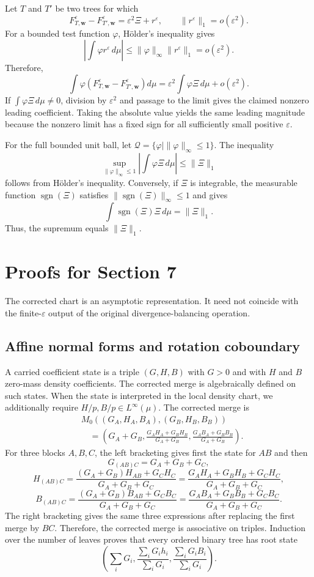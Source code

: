 \documentclass[11pt]{article}
\theoremstyle{plain}
\theoremstyle{definition}
\theoremstyle{definition}
\newcommand{\eps}{\varepsilon}
\newcommand{\QoI}{\mathcal Q}
\newcommand{\wv}{\mathbf w}
\newcommand{\Fw}[1]{F_{#1,\wv}^{\eps}}
\begin{document}
Let $T$ and $T'$ be two trees for which
\[
\Fw{T}-\Fw{T'}=\eps^2\Xi+r^\eps,
\qquad
\|r^\eps\|_1=o(\eps^2).
\]
For a bounded test function $\varphi$, H\"older's inequality gives
\[
\left|\int \varphi r^\eps\,d\mu\right|
\le \|\varphi\|_\infty\|r^\eps\|_1=o(\eps^2).
\]
Therefore,
\[
\int \varphi(\Fw{T}-\Fw{T'})d\mu
=\eps^2\int\varphi\Xi\,d\mu+o(\eps^2).
\]
If $\int\varphi\Xi\,d\mu\ne0$, division by $\eps^2$ and passage to the limit gives the claimed nonzero leading coefficient. Taking the absolute value yields the same leading magnitude because the nonzero limit has a fixed sign for all sufficiently small positive $\eps$.

For the full bounded unit ball, let $\QoI=\{\varphi \mid \|\varphi\|_\infty\le1\}$. The inequality
\[
\sup_{\|\varphi\|_\infty\le1}\left|\int\varphi\Xi\,d\mu\right|\le \|\Xi\|_1
\]
follows from H\"older's inequality. Conversely, if $\Xi$ is integrable, the measurable function $\operatorname{sgn}(\Xi)$ satisfies $\|\operatorname{sgn}(\Xi)\|_\infty\le1$ and gives
\[
\int \operatorname{sgn}(\Xi)\Xi\,d\mu=\|\Xi\|_1.
\]
Thus, the supremum equals $\|\Xi\|_1$.

\section{Proofs for Section 7}
 The corrected chart is an asymptotic representation. It need not coincide with the finite-$\eps$ output of the original divergence-balancing operation.

\subsection{\texorpdfstring{Affine normal forms and rotation coboundary}{Affine normal forms and rotation coboundary}}

A carried coefficient state is a triple $(G,H,B)$ with $G>0$ and with $H$ and $B$ zero-mass density coefficients. The corrected merge is algebraically defined on such states. When the state is interpreted in the local density chart, we additionally require $H/p,B/p\in L^\infty(\mu)$. The corrected merge is
\[
\begin{aligned}
&M_0((G_A,H_A,B_A),(G_B,H_B,B_B))\\
&\quad=\left(G_A+G_B,
\frac{G_AH_A+G_BH_B}{G_A+G_B},
\frac{G_AB_A+G_BB_B}{G_A+G_B}\right).
\end{aligned}
\]
For three blocks $A,B,C$, the left bracketing gives first the state for $AB$ and then
\[
G_{(AB)C}=G_A+G_B+G_C,
\]
\[
H_{(AB)C}=\frac{(G_A+G_B)H_{AB}+G_CH_C}{G_A+G_B+G_C}
=\frac{G_AH_A+G_BH_B+G_CH_C}{G_A+G_B+G_C},
\]
\[
B_{(AB)C}=\frac{(G_A+G_B)B_{AB}+G_CB_C}{G_A+G_B+G_C}
=\frac{G_AB_A+G_BB_B+G_CB_C}{G_A+G_B+G_C}.
\]
The right bracketing gives the same three expressions after replacing the first merge by $BC$. Therefore, the corrected merge is associative on triples. Induction over the number of leaves proves that every ordered binary tree has root state
\[
\left(\sum_iG_i,
\frac{\sum_iG_i h_i}{\sum_iG_i},
\frac{\sum_iG_i B_i}{\sum_iG_i}\right).
\]
\end{document}
